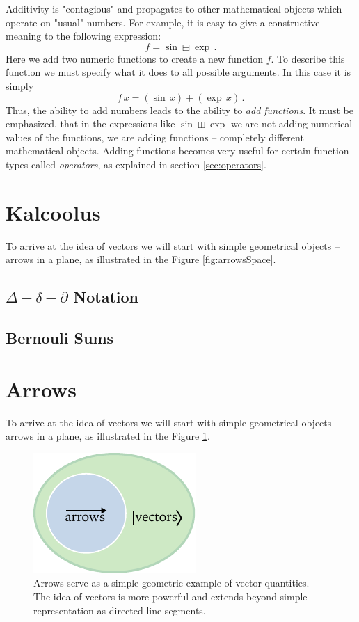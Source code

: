 Additivity is "contagious" and propagates to other mathematical objects which operate on "usual" numbers. For example, it is easy to give a constructive meaning to the following expression:
\[
f = \sin\boxplus\exp\,.
\]
Here we add two numeric functions to create a new function $f$. To describe this function we must specify what it does to all possible arguments. In this case it is simply
\[
f\,x=(\sin\, x)+(\exp\, x)\,.
\]
Thus, the ability to add numbers leads to the ability to \emph{add functions}. It must be emphasized, that in the expressions like $\sin\boxplus\exp$ we are not adding numerical values of the functions, we are adding functions -- completely different mathematical objects. Adding functions becomes very useful for certain function types called \emph{operators}, as explained in section \ref{sec:operators}.


\section{Kalcoolus}

To arrive at the idea of vectors we will start with simple geometrical
objects -- arrows in a plane, as illustrated in the Figure \ref{fig:arrowsSpace}.

\subsection{$\Delta-\delta-\partial$ Notation}

\subsection{Bernouli Sums}

\section{Arrows}

To arrive at the idea of vectors we will start with simple geometrical
objects -- arrows in a plane, as illustrated in the Figure \ref{fig:arrowsAndVectors}.

\begin{figure}[htbp]
  \centering
  \includegraphics[scale=1.0]{arrowsAndVectors}
  \caption{Arrows serve as a simple geometric example of vector quantities. The idea of vectors is more powerful and extends beyond simple representation as directed line segments.}
  \label{fig:arrowsAndVectors}
\end{figure}

